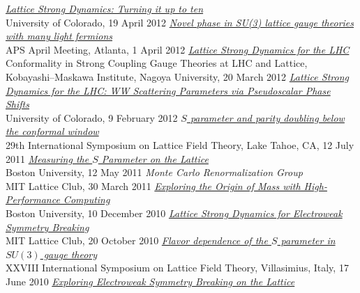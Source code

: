 \begin{spacelist}
\begin{revnumerate}
      \textit{\href{http://www.davidschaich.net/talks/LSD10f_1204.pdf}{Lattice Strong Dynamics: Turning it up to ten}} \\
      University of Colorado, 19 April 2012
    \pagebreakitem
      \textit{\href{http://www.davidschaich.net/talks/April12}{Novel phase in SU(3) lattice gauge theories with many light fermions}} \\
      APS April Meeting, Atlanta, 1 April 2012
    \pagebreakitem
      \textit{\href{http://www.davidschaich.net/talks/SCGT12Mini.pdf}{Lattice Strong Dynamics for the LHC}} \\
      Conformality in Strong Coupling Gauge Theories at LHC and Lattice, \\ Kobayashi--Maskawa Institute, Nagoya University, 20 March 2012
    \pagebreakitem
      \textit{\href{http://www.davidschaich.net/talks/1202WW.pdf}{Lattice Strong Dynamics for the LHC: WW Scattering Parameters via Pseudoscalar Phase Shifts}} \\
      University of Colorado, 9 February 2012
    \pagebreakitem
      \textit{\href{http://www.davidschaich.net/talks/Lattice11.pdf}{$S$ parameter and parity doubling below the conformal window}} \\
      29th International Symposium on Lattice Field Theory, Lake Tahoe, CA, 12 July 2011
    \pagebreakitem
      \textit{\href{http://www.davidschaich.net/talks/defense.pdf}{Measuring the $S$ Parameter on the Lattice}} \\
      Boston University, 12 May 2011
    \pagebreakitem
      \textit{Monte Carlo Renormalization Group} \\
      MIT Lattice Club, 30 March 2011
    \pagebreakitem
      \textit{\href{http://www.davidschaich.net/talks/BUseminar.pdf}{Exploring the Origin of Mass with High-Performance Computing}} \\
      Boston University, 10 December 2010
    \pagebreakitem
      \textit{\href{http://www.davidschaich.net/talks/1010MIT.pdf}{Lattice Strong Dynamics for Electroweak Symmetry Breaking}} \\
      MIT Lattice Club, 20 October 2010
    \pagebreakitem
      \textit{\href{http://www.davidschaich.net/talks/Lattice10.pdf}{Flavor dependence of the $S$ parameter in $SU(3)$ gauge theory}} \\
      XXVIII International Symposium on Lattice Field Theory, Villasimius, Italy, 17 June 2010
    \pagebreakitem
      \textit{\href{http://www.davidschaich.net/talks/EWSB_lattice.pdf}{Exploring Electroweak Symmetry Breaking on the Lattice}} \\

\end{revnumerate}
\end{spacelist}
